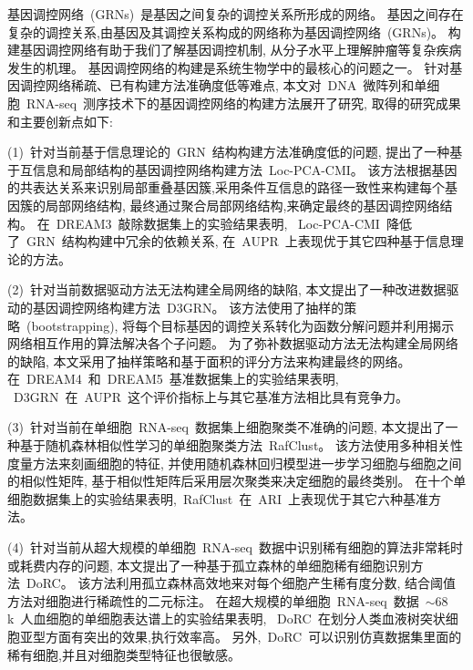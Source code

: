 \begin{abstractcn}\setlength{\baselineskip}{20pt}%

基因调控网络~(GRNs)~是基因之间复杂的调控关系所形成的网络。
基因之间存在复杂的调控关系,由基因及其调控关系构成的网络称为基因调控网络~(GRNs)。
构建基因调控网络有助于我们了解基因调控机制,
从分子水平上理解肿瘤等复杂疾病发生的机理。
基因调控网络的构建是系统生物学中的最核心的问题之一。
针对基因调控网络稀疏、已有构建方法准确度低等难点, 
本文对~DNA~微阵列和单细胞~RNA-seq~测序技术下的基因调控网络的构建方法展开了研究,
取得的研究成果和主要创新点如下:

(1)~针对当前基于信息理论的~GRN~结构构建方法准确度低的问题,
提出了一种基于互信息和局部结构的基因调控网络构建方法~Loc-PCA-CMI。
该方法根据基因的共表达关系来识别局部重叠基因簇,采用条件互信息的路径一致性来构建每个基因簇的局部网络结构,
最终通过聚合局部网络结构,来确定最终的基因调控网络结构。
在~DREAM3~敲除数据集上的实验结果表明,
~Loc-PCA-CMI~降低了~GRN~结构构建中冗余的依赖关系,
在~AUPR~上表现优于其它四种基于信息理论的方法。

(2)~针对当前数据驱动方法无法构建全局网络的缺陷,
本文提出了一种改进数据驱动的基因调控网络构建方法~D3GRN。
该方法使用了抽样的策略~(bootstrapping),
将每个目标基因的调控关系转化为函数分解问题并利用揭示网络相互作用的算法解决各个子问题。
为了弥补数据驱动方法无法构建全局网络的缺陷,
本文采用了抽样策略和基于面积的评分方法来构建最终的网络。
在~DREAM4~和~DREAM5~基准数据集上的实验结果表明,
~D3GRN~在~AUPR~这个评价指标上与其它基准方法相比具有竞争力。

(3)~针对当前在单细胞~RNA-seq~数据集上细胞聚类不准确的问题,
本文提出了一种基于随机森林相似性学习的单细胞聚类方法~RafClust。
该方法使用多种相关性度量方法来刻画细胞的特征, 
并使用随机森林回归模型进一步学习细胞与细胞之间的相似性矩阵,
基于相似性矩阵后采用层次聚类来决定细胞的最终类别。
在十个单细胞数据集上的实验结果表明,~RafClust~在~ARI~上表现优于其它六种基准方法。

(4)~针对当前从超大规模的单细胞~RNA-seq~数据中识别稀有细胞的算法非常耗时或耗费内存的问题,
本文提出了一种基于孤立森林的单细胞稀有细胞识别方法~DoRC。
该方法利用孤立森林高效地来对每个细胞产生稀有度分数,
结合阈值方法对细胞进行稀疏性的二元标注。
在超大规模的单细胞~RNA-seq~数据~${\sim}68$k~人血细胞的单细胞表达谱上的实验结果表明,
~DoRC~在划分人类血液树突状细胞亚型方面有突出的效果,执行效率高。
另外,~DoRC~可以识别仿真数据集里面的稀有细胞,并且对细胞类型特征也很敏感。


\end{abstractcn}

